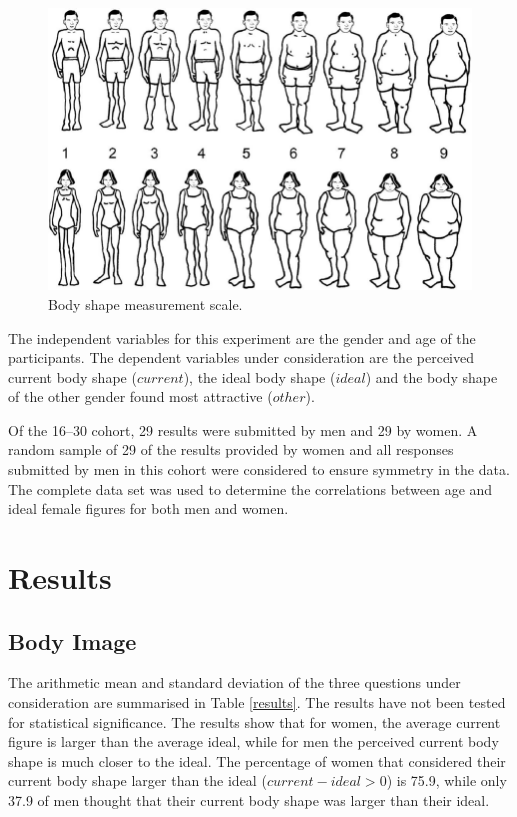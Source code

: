 \documentclass[a4paper, jou, 11pt]{apa6}
\begin{document}
\begin{figure}[htbp]
\centering
\includegraphics[width=.9\linewidth]{BodyScale.png}
\caption{Body shape measurement scale. \label{scale}}
\end{figure}

The independent variables for this experiment are the gender and age of the participants. The dependent variables under consideration are the perceived current body shape (\(current\)), the ideal body shape (\(ideal\)) and the body shape of the other gender found most attractive (\(other\)). 

Of the 16--30 cohort, 29 results were submitted by men and 29 by women. A random sample of 29 of the results provided by women and all responses submitted by men in this cohort were considered to ensure symmetry in the data. The complete data set was used to determine the correlations between age and ideal female figures for both men and women.
\section{Results}
\label{sec:org88731a3}
\subsection{Body Image}
\label{sec:org5a55694}
The arithmetic mean and standard deviation of the three questions under consideration are summarised in Table \ref{results}. The results have not been tested for statistical significance. The results show that for women, the average current figure is larger than the average ideal, while for men the perceived current body shape is much closer to the ideal. The percentage of women that considered their current body shape larger than the ideal (\(current-ideal>0\)) is 75.9, while only 37.9 of men thought that their current body shape was larger than their ideal.
\end{document}
